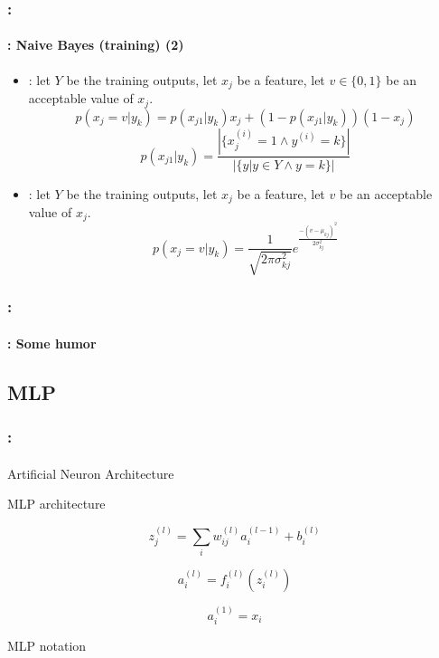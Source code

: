 \documentclass[xcolor=table]{beamer}
\begin{document}
\begin{frame}
	\frametitle{\insertshortsubtitle: \insertsection}
	\framesubtitle{\insertsubsection: Naive Bayes (training) (2)}
	\small
	
	\begin{itemize}
		\item {}: let $ Y $ be the training outputs, let $ x_j $ be a feature, let $ v \in \{0, 1\}$ be an acceptable value of $ x_j $.
		\[p(x_j = v|y_k) = p(x_{j1}|y_k) x_j + (1-p(x_{j1}|y_k)) (1-x_j)\]
		\[p(x_{j1}|y_k) = \frac{|\{x_j^{(i)} = 1 \wedge y^{(i)} = k\}|}{|\{y | y \in Y \wedge y = k\}|}\]
		\item {}: let $ Y $ be the training outputs, let $ x_j $ be a feature, let $ v $ be an acceptable value of $ x_j $.
		\[p(x_j = v|y_k) = \frac{1}{\sqrt{2\pi \sigma_{kj}^2}} e^\frac{-(v-\mu_{kj})^2}{2 \sigma_{kj}^2}\]
	\end{itemize}
	
\end{frame}

\begin{frame}
	\frametitle{\insertshortsubtitle: \insertsection}
	\framesubtitle{\insertsubsection: Some humor}
	
	\begin{center}
	\end{center}
	
\end{frame}

\subsection{MLP}

\begin{frame}
	\frametitle{\insertshortsubtitle: \insertsection}
	\framesubtitle{\insertsubsection}
	
	\begin{minipage}{0.39\textwidth}
		\centering 
		Artificial Neuron Architecture
		
	\end{minipage}
	\begin{minipage}{0.4\textwidth} 
		\centering
		MLP architecture
		
	\end{minipage}
	
	\begin{minipage}{0.39\textwidth}
		\[z_j^{(l)} = \sum_i w_{ij}^{(l)} a_{i}^{(l-1)} + b_{i}^{(l)}\]
		
		\[a_{i}^{(l)} = f_{i}^{(l)}(z_{i}^{(l)})\]
		
		\[a_{i}^{(1)} = x_{i}\]
	\end{minipage}
	\begin{minipage}{0.6\textwidth} 
		\centering
		MLP notation
		
	\end{minipage}
	
\end{frame}
\end{document}
